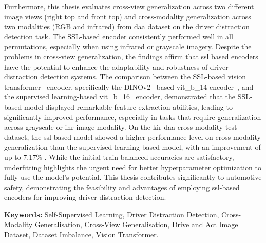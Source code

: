 \documentclass{report} %
\begin{document}
Furthermore, this thesis evaluates cross-view generalization across two different image views (right top and front top) and cross-modality generalization across two modalities (RGB and infrared) from \gls{daa} dataset on the driver distraction detection task. The SSL-based encoder consistently performed well in all permutations, especially when using infrared or grayscale imagery. Despite the problems in cross-view generalization, the findings affirm that \gls{ssl} based encoders have the potential to enhance the adaptability and robustness of driver distraction detection systems. The comparison between the SSL-based vision transformer~\citep{Vit_Paper_Dosovitskiy2020AnII} encoder, specifically the DINOv2~\citep{dinov2_oquab2023dinov2} based vit\_b\_14 encoder~\citep{dinov2_github}, and the supervised learning-based vit\_b\_16~\citep{vit_b_16_pytorch} encoder, demonstrated that the SSL-based model displayed remarkable feature extraction abilities, leading to significantly improved performance, especially in tasks that require generalization across grayscale or \gls{inr} image modality. On the \gls{kir} \gls{daa} cross-modality test dataset, the \gls{ssl}-based model showed a higher performance level on cross-modality generalization than the supervised learning-based model, with an improvement of up to 7.17\% . While the initial train balanced accuracies are satisfactory, underfitting highlights the urgent need for better hyperparameter optimization to fully use the model's potential. This thesis contributes significantly to automotive safety, demonstrating the feasibility and advantages of employing \gls{ssl}-based encoders for improving driver distraction detection.

\textbf{Keywords:} Self-Supervised Learning, Driver Distraction Detection, Cross-Modality Generalisation, Cross-View Generalisation, Drive and Act Image Dataset, Dataset Imbalance, Vision Transformer. 







\printglossary


\newpage
\end{document}
